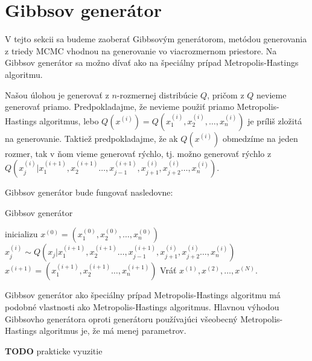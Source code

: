 \section{Gibbsov generátor}

V tejto sekcii sa budeme zaoberať Gibbsovým generátorom, metódou generovania z triedy MCMC vhodnou na generovanie vo viacrozmernom priestore. Na Gibbsov generátor sa možno dívať ako na špeciálny prípad Metropolis-Hastings algoritmu.

Našou úlohou je generovať z $n$-rozmernej distribúcie $Q$, pričom z $Q$ nevieme generovať priamo. Predpokladajme, že nevieme použiť priamo Metropolis-Hastings algoritmus, lebo $Q(x^{(i)})=Q(x^{(i)}_1, x^{(i)}_2, \dots, x^{(i)}_n)$ je príliš zložitá na generovanie. Taktiež predpokladajme, že ak $Q(x^{(i)})$ obmedzíme na jeden rozmer, tak v ňom vieme generovať rýchlo, tj. možno generovať rýchlo z $Q(x^{(i)}_j | x^{(i+1)}_1, x^{(i+1)}_2 \dots, x^{(i+1)}_{j-1}, x^{(i)}_{j+1}, x^{(i)}_{j+2} \dots, x^{(i)}_n)$.

Gibbsov generátor bude fungovať nasledovne:

\begin{algorithm}[H]
	\caption{Gibbsov generátor \cite{mcmc_intro_mackay}}
	\label{gibbs}
	\begin{algorithmic}[1]
		\State inicializu $x^{(0)} = (x^{(0)}_1, x^{(0)}_2, \dots, x^{(0)}_n)$
				\State $x^{(i)}_j \sim Q(x_j | x^{(i+1)}_1, x^{(i+1)}_2 \dots, x^{(i+1)}_{j-1}, x^{(i)}_{j+1}, x^{(i)}_{j+2} \dots, x^{(i)}_n)$
			\EndFor
			\State $x^{(i+1)}= (x^{(i+1)}_1, x^{(i+1)}_2 \dots, x^{(i+1)}_n)$
		\EndFor
		\State Vráť ${x^{(1)},x^{(2)},\dots,x^{(N)}}$.
	\end{algorithmic}
\end{algorithm}

Gibbsov generátor ako špeciálny prípad Metropolis-Hastings algoritmu má podobné vlastnosti ako Metropolis-Hastings algoritmus. Hlavnou výhodou Gibbsovho generátora oproti generátoru používajúci všeobecný Metropolis-Hastings algoritmus je, že má menej parametrov. 

\textbf{TODO} prakticke vyuzitie

